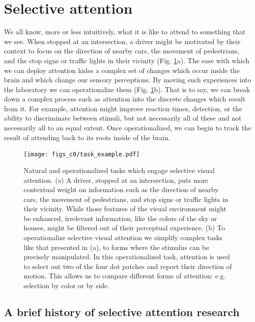 \section{Selective attention}

We all know, more or less intuitively, what it is like to attend to something that we see. When stopped at an intersection, a driver might be motivated by their context to focus on the direction of nearby cars, the movement of pedestrians, and the stop signs or traffic lights in their vicinity (Fig. \ref{fig:c0f1}a). The ease with which we can deploy attention hides a complex set of changes which occur inside the brain and which change our sensory perceptions. By moving such experiences into the laboratory we can operationalize them (Fig. \ref{fig:c0f1}b). That is to say, we can break down a complex process such as attention into the discrete changes which result from it. For example, attention might improve reaction times, detection, or the ability to discriminate between stimuli, but not necessarily all of these and not necessarily all to an equal extent. Once operationalized, we can begin to track the result of attending back to its roots inside of the brain.

\begin{figure}[ht]
\centering
\texttt{[image: figs\_c0/task\_example.pdf]}
\caption[Selective visual attention tasks]{Natural and operationalized tasks which engage selective visual attention. (a) A driver, stopped at an intersection, puts more contextual weight on information such as the direction of nearby cars, the movement of pedestrians, and stop signs or traffic lights in their vicinity. While those features of the visual environment might be enhanced, irrelevant information, like the colors of the sky or houses, might be filtered out of their perceptual experience. (b) To operationalize selective visual attention we simplify complex tasks like that presented in (a), to forms where the stimulus can be precisely manipulated. In this operationalized task, attention is used to select out two of the four dot patches and report their direction of motion. This allows us to compare different forms of attention: e.g. selection by color or by side.}
\label{fig:c0f1}
\end{figure}

\subsection{A brief history of selective attention research}

